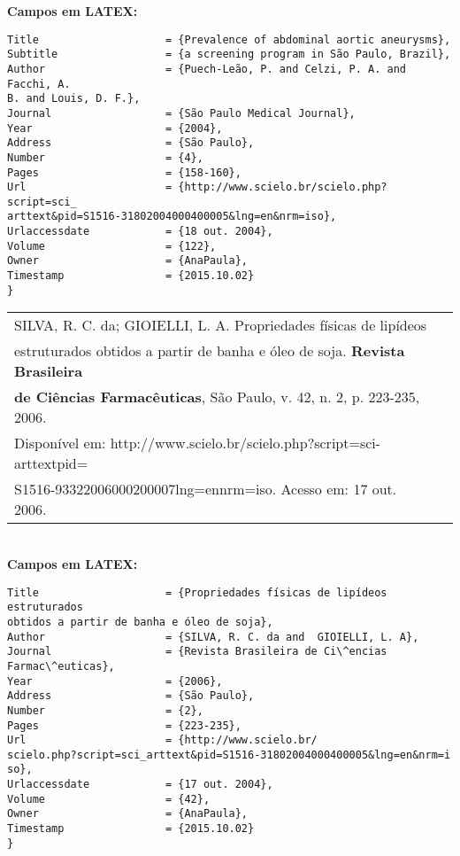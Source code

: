 \textbf{Campos em LATEX:} 

\begin{verbatim}
Title                    = {Prevalence of abdominal aortic aneurysms},
Subtitle                 = {a screening program in São Paulo, Brazil},
Author                   = {Puech-Leão, P. and Celzi, P. A. and Facchi, A. 
B. and Louis, D. F.},
Journal                  = {São Paulo Medical Journal},
Year                     = {2004},
Address                  = {São Paulo},
Number                   = {4},
Pages                    = {158-160},
Url                      = {http://www.scielo.br/scielo.php?script=sci_
arttext&pid=S1516-31802004000400005&lng=en&nrm=iso},
Urlaccessdate            = {18 out. 2004},
Volume                   = {122},
Owner                    = {AnaPaula},
Timestamp                = {2015.10.02}
}
\end{verbatim}

\begin{tabular}{|l|c|} \hline
	SILVA, R. C. da; GIOIELLI, L. A. Propriedades físicas de lipídeos \\estruturados obtidos a partir de banha e óleo de soja. \textbf{Revista Brasileira} \\\textbf{de Ci\^encias Farmac\^euticas}, São Paulo, v. 42, n. 2, p. 223-235, 2006.\\
	Disponível em: http://www.scielo.br/scielo.php?script=sci-arttextpid=\\
	S1516-93322006000200007lng=ennrm=iso. Acesso em: 17 out. 2006. \\\hline
\end{tabular} \\

\textbf{Campos em LATEX:} 

\begin{verbatim}
Title                    = {Propriedades físicas de lipídeos estruturados
obtidos a partir de banha e óleo de soja},
Author                   = {SILVA, R. C. da and  GIOIELLI, L. A},
Journal                  = {Revista Brasileira de Ci\^encias
Farmac\^euticas},
Year                     = {2006},
Address                  = {São Paulo},
Number                   = {2},
Pages                    = {223-235},
Url                      = {http://www.scielo.br/
scielo.php?script=sci_arttext&pid=S1516-31802004000400005&lng=en&nrm=i
so},
Urlaccessdate            = {17 out. 2004},
Volume                   = {42},
Owner                    = {AnaPaula},
Timestamp                = {2015.10.02}
}
\end{verbatim}

